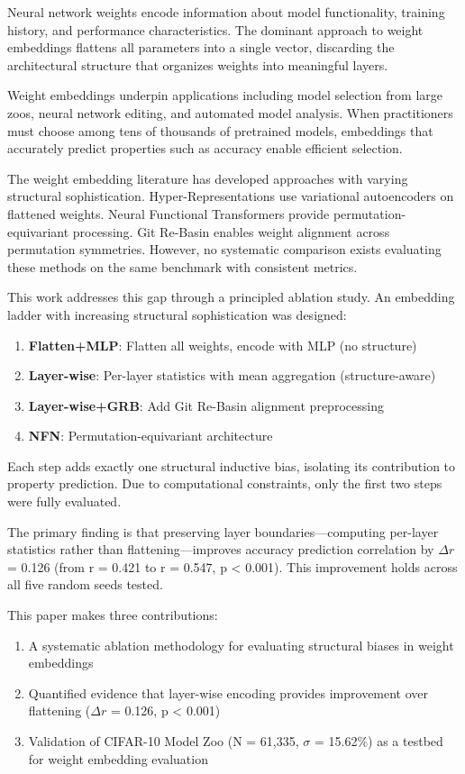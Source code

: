 
Neural network weights encode information about model functionality, training history, and performance characteristics. The dominant approach to weight embeddings flattens all parameters into a single vector, discarding the architectural structure that organizes weights into meaningful layers.

Weight embeddings underpin applications including model selection from large zoos, neural network editing, and automated model analysis. When practitioners must choose among tens of thousands of pretrained models, embeddings that accurately predict properties such as accuracy enable efficient selection.

The weight embedding literature has developed approaches with varying structural sophistication. Hyper-Representations use variational autoencoders on flattened weights. Neural Functional Transformers provide permutation-equivariant processing. Git Re-Basin enables weight alignment across permutation symmetries. However, no systematic comparison exists evaluating these methods on the same benchmark with consistent metrics.

This work addresses this gap through a principled ablation study. An embedding ladder with increasing structural sophistication was designed:

\begin{enumerate}
\item \textbf{Flatten+MLP}: Flatten all weights, encode with MLP (no structure)
\item \textbf{Layer-wise}: Per-layer statistics with mean aggregation (structure-aware)
\item \textbf{Layer-wise+GRB}: Add Git Re-Basin alignment preprocessing
\item \textbf{NFN}: Permutation-equivariant architecture
\end{enumerate}

Each step adds exactly one structural inductive bias, isolating its contribution to property prediction. Due to computational constraints, only the first two steps were fully evaluated.

The primary finding is that preserving layer boundaries---computing per-layer statistics rather than flattening---improves accuracy prediction correlation by $\Delta r$ = 0.126 (from r = 0.421 to r = 0.547, p < 0.001). This improvement holds across all five random seeds tested.

This paper makes three contributions:

\begin{enumerate}
\item A systematic ablation methodology for evaluating structural biases in weight embeddings
\item Quantified evidence that layer-wise encoding provides improvement over flattening ($\Delta r$ = 0.126, p < 0.001)
\item Validation of CIFAR-10 Model Zoo (N = 61,335, $\sigma$ = 15.62\%) as a testbed for weight embedding evaluation
\end{enumerate}
